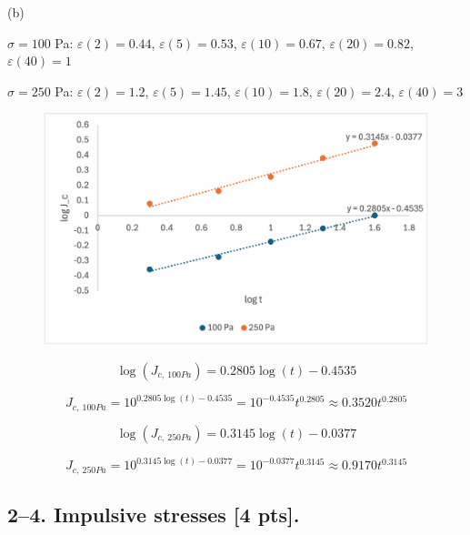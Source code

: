 \documentclass{article}
\begin{document}
\bigskip

(b)

$\sigma=100$ Pa: $\varepsilon(2) = 0.44$, $\varepsilon(5) = 0.53$, $\varepsilon(10) = 0.67$, $\varepsilon(20) = 0.82$, $\varepsilon(40) = 1$

$\sigma=250$ Pa: $\varepsilon(2) = 1.2$, $\varepsilon(5) = 1.45$, $\varepsilon(10) = 1.8$, $\varepsilon(20) = 2.4$, $\varepsilon(40) = 3$

\begin{figure}[ht]
    \centering
    \includegraphics[width=1\linewidth]{Picture1.png}
    \label{fig:placeholder}
\end{figure}

\begin{equation*}
    \log(J_{c,\ 100 Pa}) = 0.2805 \log(t) - 0.4535
\end{equation*}

\begin{equation*}
    J_{c,\ 100 Pa} = 10^{0.2805 \log(t) - 0.4535} = 10^{-0.4535} t^{0.2805} \approx 0.3520 t^{0.2805}
\end{equation*}

\bigskip

\begin{equation*}
    \log(J_{c,\ 250 Pa}) = 0.3145 \log(t) - 0.0377
\end{equation*}

\begin{equation*}
    J_{c,\ 250 Pa} = 10^{0.3145 \log(t) - 0.0377} = 10^{-0.0377} t^{0.3145} \approx 0.9170 t^{0.3145}
\end{equation*}

\newpage


\subsection*{2--4. \textbf{Impulsive stresses} [4 pts].}
\end{document}
